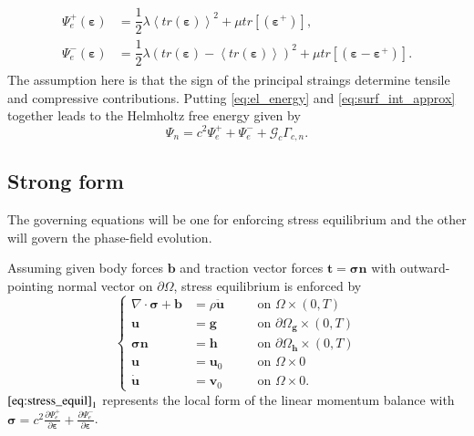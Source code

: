 \begin{align} \label{eq:psi_e+-}
	\begin{aligned}
		\Psi_{e}^{+}\left(\bm{\varepsilon}\right) &= \dfrac{1}{2}\lambda\left<tr\left(\bm{\varepsilon}\right)\right>^{2}+\mu tr\left[\left(\bm{\varepsilon}^{+}\right)\right], \\
		\Psi_{e}^{-}\left(\bm{\varepsilon}\right) &= \dfrac{1}{2}\lambda\left(tr\left(\bm{\varepsilon}\right)-\left<tr\left(\bm{\varepsilon}\right)\right>\right)^{2}+\mu tr\left[\left(\bm{\varepsilon}-\bm{\varepsilon}^{+}\right)\right].
	\end{aligned}
\end{align}
The assumption here is that the sign of the principal straings determine tensile and compressive contributions. Putting \eqref{eq:el_energy} and \eqref{eq:surf_int_approx} together leads to the Helmholtz free energy given by
\begin{equation} \label{eq:Helmholtz}
	\Psi_{n}=c^{2}\Psi_{e}^{+}+\Psi_{e}^{-}+\mathcal{G}_{c}\Gamma_{c,n}.
\end{equation}

\subsection{Strong form} \label{sec:strong_form}
The governing equations will be one for enforcing stress equilibrium and the other will govern the phase-field evolution.

Assuming given body forces $\mathbf{b}$ and traction vector forces $\mathbf{t}=\bm{\sigma}\mathbf{n}$ with outward-pointing normal vector on $\partial\Omega$, stress equilibrium is enforced by
\begin{equation} \label{eq:stress_equil}
	 \left\{\begin{alignedat}{2}
\nabla\cdot\bm{\sigma}+\mathbf{b} &= \rho\ddot{\mathbf{u}} && \quad\text{on } \Omega\times\left(0,T\right) \\
		\mathbf{u} &= \mathbf{g} && \quad\text{on } \partial\Omega_{\mathbf{g}}\times\left(0,T\right) \\
		\bm{\sigma}\mathbf{n} &= \mathbf{h} && \quad\text{on } \partial\Omega_{\mathbf{h}}\times\left(0,T\right) \\
		\mathbf{u} &= \mathbf{u}_{0} && \quad\text{on } \Omega\times0 \\
		\dot{\mathbf{u}} &= \mathbf{v}_{0} && \quad\text{on } \Omega\times0.
  \end{alignedat}\right.
\end{equation}
$\eqref{eq:stress_equil}_{1}$ represents the local form of the linear momentum balance with $\bm{\sigma}=c^{2}\frac{\partial\Psi_{e}^{+}}{\partial\bm{\varepsilon}}+\frac{\partial\Psi_{e}^{-}}{\partial\bm{\varepsilon}}$.

